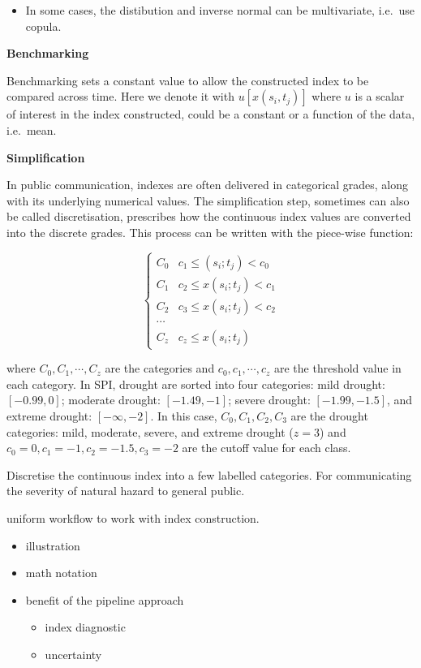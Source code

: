 \documentclass[
]{article}
\providecommand{\tightlist}{%
  \setlength{\itemsep}{0pt}\setlength{\parskip}{0pt}}\usepackage{longtable,booktabs,array}
\begin{document}
\begin{itemize}
\tightlist
\item
  In some cases, the distibution and inverse normal can be multivariate,
  i.e.~use copula.
\end{itemize}

\textbf{Benchmarking}

Benchmarking sets a constant value to allow the constructed index to be
compared across time. Here we denote it with \(u[x(s_i, t_j)]\) where
\(u\) is a scalar of interest in the index constructed, could be a
constant or a function of the data, i.e.~mean.

\textbf{Simplification}

In public communication, indexes are often delivered in categorical
grades, along with its underlying numerical values. The simplification
step, sometimes can also be called discretisation, prescribes how the
continuous index values are converted into the discrete grades. This
process can be written with the piece-wise function:

\[
\begin{cases}
C_0 & c_1 \leq (s_i; t_j) < c_0 \\
C_1 & c_2 \leq x(s_i; t_j) < c_1 \\
C_2 & c_3 \leq x(s_i; t_j) < c_2 \\
\cdots \\
C_z & c_z \leq x(s_i; t_j)
\end{cases}
\]

where \(C_0, C_1,\cdots ,C_z\) are the categories and
\(c_0, c_1, \cdots, c_z\) are the threshold value in each category. In
SPI, drought are sorted into four categories: mild drought:
\([-0.99, 0]\); moderate drought: \([-1.49, -1]\); severe drought:
\([-1.99, -1.5]\), and extreme drought: \([-\infty, -2]\). In this case,
\(C_0, C_1, C_2, C_3\) are the drought categories: mild, moderate,
severe, and extreme drought (\(z = 3\)) and
\(c_0 =0, c_1 = -1, c_2 = -1.5, c_3 = -2\) are the cutoff value for each
class.

Discretise the continuous index into a few labelled categories. For
communicating the severity of natural hazard to general public.

uniform workflow to work with index construction.

\begin{itemize}
\tightlist
\item
  illustration
\item
  math notation
\item
  benefit of the pipeline approach

  \begin{itemize}
  \tightlist
  \item
    index diagnostic
  \item
    uncertainty
  \end{itemize}
\end{itemize}
\end{document}
